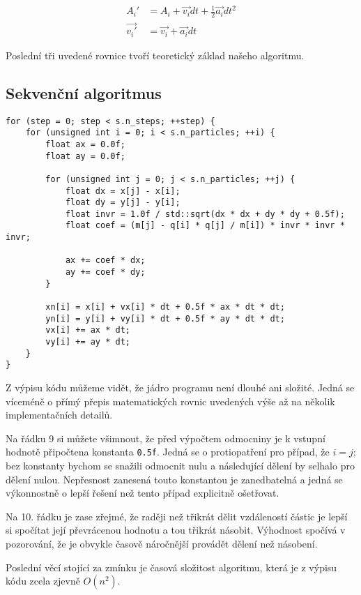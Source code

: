 \documentclass[10pt,a4paper]{article}
\begin{document}
\begin{align*}
A_i' &= A_i + \vec{v_i} dt + \frac{1}{2}\vec{a_i} dt^2 \\
\vec{v_i'} &= \vec{v_i} + \vec{a_i} dt
\end{align*}

Poslední tři uvedené rovnice tvoří teoretický základ našeho algoritmu.

\subsection{Sekvenční algoritmus}

\begin{lstlisting}
for (step = 0; step < s.n_steps; ++step) {
    for (unsigned int i = 0; i < s.n_particles; ++i) {
        float ax = 0.0f;
        float ay = 0.0f;

        for (unsigned int j = 0; j < s.n_particles; ++j) {
            float dx = x[j] - x[i];
            float dy = y[j] - y[i];
            float invr = 1.0f / std::sqrt(dx * dx + dy * dy + 0.5f);
            float coef = (m[j] - q[i] * q[j] / m[i]) * invr * invr * invr;

            ax += coef * dx;
            ay += coef * dy;
        }

        xn[i] = x[i] + vx[i] * dt + 0.5f * ax * dt * dt;
        yn[i] = y[i] + vy[i] * dt + 0.5f * ay * dt * dt;
        vx[i] += ax * dt;
        vy[i] += ay * dt;
    }
}
\end{lstlisting}

Z výpisu kódu můžeme vidět, že jádro programu není dlouhé ani složité. Jedná
se víceméně o přímý přepis matematických rovnic uvedených výše až na několik
implementačních detailů.

Na řádku 9 si můžete všimnout, že před výpočtem odmocniny je k vstupní
hodnotě připočtena konstanta \texttt{0.5f}. Jedná se o protiopatření
pro případ, že $ i = j $; bez konstanty bychom se snažili odmocnit
nulu a následující dělení by selhalo pro dělení nulou. Nepřesnost
zanesená touto konstantou je zanedbatelná a jedná se výkonnostně o
lepší řešení než tento případ explicitně ošetřovat.

Na 10. řádku je zase zřejmé, že raději než třikrát dělit vzdáleností částic
je lepší si spočítat její převrácenou hodnotu a tou třikrát násobit. Výhodnost
spočívá v pozorování, že je obvykle časově náročnější provádět dělení než
násobení.

Poslední věcí stojící za zmínku je časová složitost algoritmu, která
je z výpisu kódu zcela zjevně $ O(n^2) $.
\end{document}
